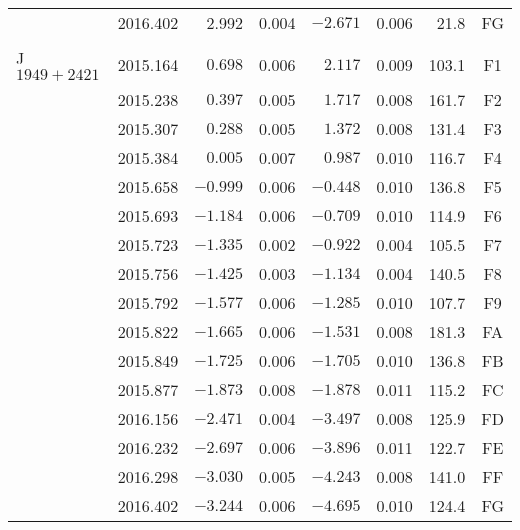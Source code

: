 \begin{table}[h]
\begin{tabular}{lrrrrrrc}
						&2016.402 &  2.992   &  0.004  &  $-2.671$ &  0.006 & 21.8 & FG \\
						&&&&&&& \\\hline
			J$1949+2421$&2015.164 & $ 0.698$ &  0.006  &  $ 2.117$ &  0.009 & 103.1 & F1 \\
						&2015.238 & $ 0.397$ &  0.005  &  $ 1.717$ &  0.008 & 161.7 & F2 \\
						&2015.307 & $ 0.288$ &  0.005  &  $ 1.372$ &  0.008 & 131.4 & F3 \\
						&2015.384 & $ 0.005$ &  0.007  &  $ 0.987$ &  0.010 & 116.7 & F4 \\
						&2015.658 & $-0.999$ &  0.006  &  $-0.448$ &  0.010 & 136.8 & F5 \\
						&2015.693 & $-1.184$ &  0.006  &  $-0.709$ &  0.010 & 114.9 & F6 \\
						&2015.723 & $-1.335$ &  0.002  &  $-0.922$ &  0.004 & 105.5 & F7 \\
						&2015.756 & $-1.425$ &  0.003  &  $-1.134$ &  0.004 & 140.5 & F8 \\
						&2015.792 & $-1.577$ &  0.006  &  $-1.285$ &  0.010 & 107.7 & F9 \\
						&2015.822 & $-1.665$ &  0.006  &  $-1.531$ &  0.008 & 181.3 & FA \\
						&2015.849 & $-1.725$ &  0.006  &  $-1.705$ &  0.010 & 136.8 & FB \\
						&2015.877 & $-1.873$ &  0.008  &  $-1.878$ &  0.011 & 115.2 & FC \\
						&2016.156 & $-2.471$ &  0.004  &  $-3.497$ &  0.008 & 125.9 & FD \\
						&2016.232 & $-2.697$ &  0.006  &  $-3.896$ &  0.011 & 122.7 & FE \\
						&2016.298 & $-3.030$ &  0.005  &  $-4.243$ &  0.008 & 141.0 & FF \\
						&2016.402 & $-3.244$ &  0.006  &  $-4.695$ &  0.010 & 124.4 & FG \\
			\bottomrule
		\end{tabular}
	\end{table} 
	
